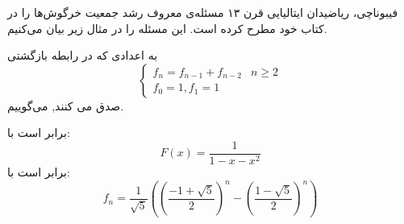 فیبوناچی، ریاضیدان ایتالیایی قرن ۱۳ ‌مسئله‌ی معروف رشد جمعیت خرگوش‌ها را در کتاب خود مطرح کرده است.
این مسئله را در مثال زیر بیان می‌کنیم.



\begin{DEFINITION}
    به اعدادی که در رابطه بازگشتی
  \[\begin{cases}
      f_{n}=f_{n-1} + f_{n-2} & n\geq 2 \\
      
      f_0=1 ,
      f_1 = 1
  \end{cases}
  \]
  صدق می کنند,
    می‌گوییم.
\end{DEFINITION}




\begin{THEOREM}
    \p
    برابر است با:
    $$F(x) = \frac{1}{1 - x - x^2}$$
    برابر است با:
    $$f_n = \frac{1}{\sqrt{5}}((\frac{-1 + \sqrt{5}}{2})^{n} - (\frac{1 - \sqrt{5}}{2})^{n})$$
\end{THEOREM}


